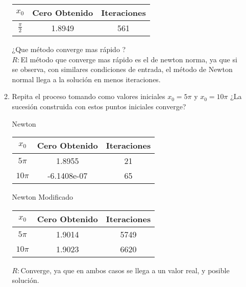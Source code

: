 \documentclass{udpreport}
\begin{document}
\begin{enumerate}
\begin{enumerate}
        \begin{table} [H]
        			\centering
        			\begin{tabular}{|c|c|c|}
        				\hline
        				$x_{0}$ & Cero Obtenido & Iteraciones\\
        				\hline
        				$\frac{\pi}{2} $ & 1.8949 & 561\\
        				\hline 
        			\end{tabular}
        		\end{table}
        ¿Que método converge mas rápido ?\\
        	$R:$El método que converge mas rápido es el de newton norma, ya que si se observa, con similares condiciones de entrada, el método de Newton normal llega a la solución en menos iteraciones.\\
        \item Repita el proceso tomando como valores iniciales $x_{0}=5\pi$ y $x_{0}=10\pi$ ¿La sucesión construida con estos puntos iniciales converge?
        	 	\begin{table} [H]Newton 
        			\centering
        			\begin{tabular}{|c|c|c|}
        				\hline
        				$x_{0}$ & Cero Obtenido & Iteraciones\\
        				\hline
        				$5\pi$ &  1.8955 & 21 \\
        				\hline 
        				$10\pi$ &-6.1408e-07 & 65\\
        				\hline
        			\end{tabular}
        		\end{table}
        		
        		\begin{table} [H]Newton Modificado
        			\centering
        			\begin{tabular}{|c|c|c|}
        				\hline
        				$x_{0}$ & Cero Obtenido & Iteraciones\\
        				\hline
        				$5\pi$ & 1.9014 &  5749 \\
        				\hline 
        				$10\pi$ & 1.9023 & 6620\\
        				\hline
        			\end{tabular}
        		\end{table}
        $R:$Converge, ya que en ambos casos se llega a un valor real, y posible solución.\\
        		

\end{enumerate}
\end{enumerate}
\end{document}
